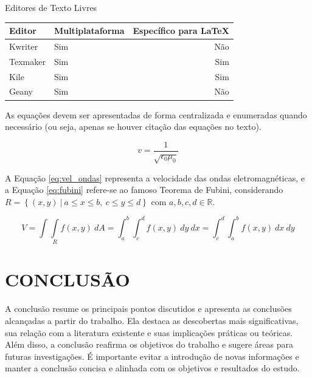 \documentclass{iftex2024}
\begin{document}
\begin{board}[!htb] \centering
\caption{Editores de Texto Livres} \label{quadro:editores_texto_livres}
\begin{varwidth}{\linewidth}
\begin{tabular}{|l|l|r|}        \hline
Editor     & Multiplataforma & Específico para LaTeX \\ \hline
Kwriter    & Sim             & Não                   \\
Texmaker   & Sim             & Sim                   \\
Kile       & Sim             & Sim                   \\
Geany      & Sim             & Não                   \\ \hline
\end{tabular}
\end{varwidth}
\end{board}

As equações devem ser apresentadas de forma centralizada e enumeradas quando necessário (ou seja, apenas se houver citação das equações no texto).

\begin{equation} \label{eq:vel_ondas}
 v=\frac{1}{\sqrt{\epsilon_0\mu_0}}
\end{equation}

A Equação \eqref{eq:vel_ondas} representa a velocidade das ondas eletromagnéticas, e a Equação \eqref{eq:fubini} refere-se ao famoso Teorema de Fubini, considerando $R=\left\{(x,y)~|~a\leq x\leq b,~c\leq y\leq d\right\}$ com $a,b,c,d\in\mathbb{R}$.

\begin{equation} \label{eq:fubini}
 V=\int\int\limits_R f(x,y)~dA=\int_a^b\int_c^d f(x,y)~dy~dx=\int_c^d\int_a^b f(x,y)~dx~dy
\end{equation}

\chapter{CONCLUSÃO}

A conclusão resume os principais pontos discutidos e apresenta as conclusões alcançadas a partir do trabalho.
Ela destaca as descobertas mais significativas, sua relação com a literatura existente e suas implicações práticas ou teóricas.
Além disso, a conclusão reafirma os objetivos do trabalho e sugere áreas para futuras investigações.
É importante evitar a introdução de novas informações e manter a conclusão concisa e alinhada com os objetivos e resultados do estudo.
\end{document}

